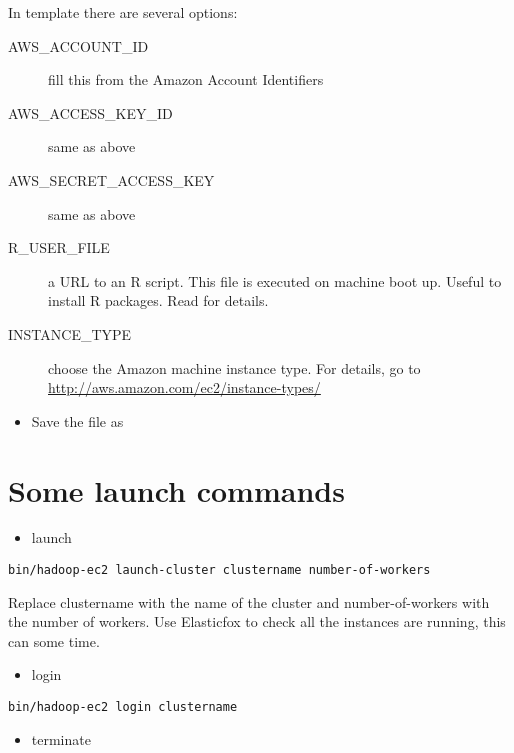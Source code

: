 \documentclass[letterpaper,10pt,english]{manual}
\begin{document}
In  template there are several options:
\begin{description}
\item[AWS\_ACCOUNT\_ID]
fill this from the Amazon Account Identifiers

\item[AWS\_ACCESS\_KEY\_ID]
same as above

\item[AWS\_SECRET\_ACCESS\_KEY]
same as above

\item[R\_USER\_FILE]
a URL to an R script. This file is executed on machine boot up. Useful to install R packages. Read  for details.

\item[INSTANCE\_TYPE]
choose the Amazon machine instance type. For details, go to
\href{http://aws.amazon.com/ec2/instance-types/}{http://aws.amazon.com/ec2/instance-types/}

\end{description}
\begin{itemize}
\item {} 
Save the file as 

\end{itemize}


\section{Some launch commands}
\begin{itemize}
\item {} 
launch

\end{itemize}

\begin{Verbatim}[commandchars=@\[\]]
bin/hadoop-ec2 launch-cluster clustername number-of-workers
\end{Verbatim}

Replace clustername with the name of the cluster and number-of-workers with the number of workers. Use Elasticfox to check all the instances are running, this can some time.
\begin{itemize}
\item {} 
login

\end{itemize}

\begin{Verbatim}[commandchars=@\[\]]
bin/hadoop-ec2 login clustername
\end{Verbatim}
\begin{itemize}
\item {} 
terminate

\end{itemize}
\end{document}

